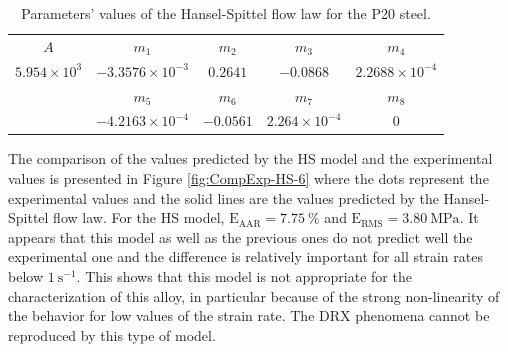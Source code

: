 \documentclass[twoside,english,1p,final,sort&compress]{elsarticle}
\theoremstyle{plain}
\DeclareRobustCommand{\RMSE}{\text{E}_\text{RMS}}
\DeclareRobustCommand{\AARE}{\text{E}_\text{AAR}}
\DeclareRobustCommand{\ps}{\text{s}^{-1}}
\begin{document}
\begin{table}[h!]
\centering
\caption{Parameters' values of the Hansel-Spittel flow law for the P20 steel.}
\begin{tabular}{ccccc}
	\hline
	        $A$          &         $m_1$          &   $m_2$   &        $m_3$         &         $m_4$         \\
	$5.954\times 10^{3}$ & $-3.3576\times10^{-3}$ & $0.2641$  &      $-0.0868$       & $2.2688\times10^{-4}$ \\ \hline
	                     &         $m_5$          &   $m_6$   &        $m_7$         &         $m_8$         \\
	                     & $-4.2163\times10^{-4}$ & $-0.0561$ & $2.264\times10^{-4}$ &          $0$          \\ \hline
\end{tabular}
\label{tab:HS}
\end{table}

The comparison of the values predicted by the HS model and the experimental values is presented in Figure \ref{fig:CompExp-HS-6} where the dots represent the experimental values and the solid lines are the values predicted by the Hansel-Spittel flow law.
For the HS model, $\AARE=7.75~\%$ and $\RMSE=3.80~\text{MPa}$.
It appears that this model as well as the previous ones do not predict well the experimental one and the difference is relatively important for all strain rates below $1~\ps$.
This shows that this model is not appropriate for the characterization of this alloy, in particular because of the strong non-linearity of the behavior for low values of the strain rate.
The DRX phenomena cannot be reproduced by this type of model.
\end{document}
